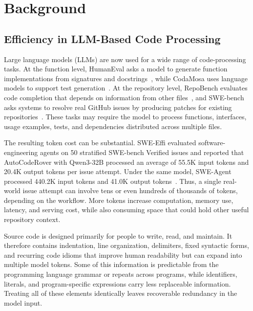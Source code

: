 
\section{Background}
\label{sec:bg}


\subsection{Efficiency in LLM-Based Code Processing}
\label{subsec:token_electricity}


Large language models (LLMs) are now used for a wide range of code-processing tasks. At the function level, HumanEval asks a model to generate function implementations from signatures and docstrings~\cite{chen2021codex}, while CodaMosa uses language models to support test generation~\cite{lemieux2023codamosa}. At the repository level, RepoBench evaluates code completion that depends on information from other files~\cite{liu2023repobench}, and SWE-bench asks systems to resolve real GitHub issues by producing patches for existing repositories~\cite{jimenez2024swebench}. These tasks may require the model to process functions, interfaces, usage examples, tests, and dependencies distributed across multiple files.

The resulting token cost can be substantial. SWE-Effi evaluated software-engineering agents on 50 stratified SWE-bench Verified issues and reported that AutoCodeRover with Qwen3-32B processed an average of 55.5K input tokens and 20.4K output tokens per issue attempt. Under the same model, SWE-Agent processed 440.2K input tokens and 41.0K output tokens~\cite{fan2025sweeffi}. Thus, a single real-world issue attempt can involve tens or even hundreds of thousands of tokens, depending on the workflow. More tokens increase computation, memory use, latency, and serving cost, while also consuming space that could hold other useful repository context.

Source code is designed primarily for people to write, read, and maintain. It therefore contains indentation, line organization, delimiters, fixed syntactic forms, and recurring code idioms that improve human readability but can expand into multiple model tokens. Some of this information is predictable from the programming language grammar or repeats across programs, while identifiers, literals, and program-specific expressions carry less replaceable information. Treating all of these elements identically leaves recoverable redundancy in the model input.

